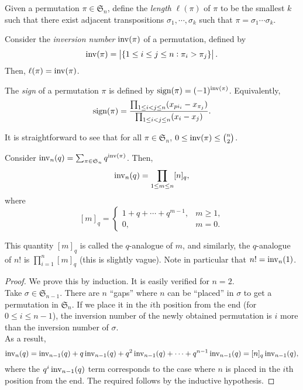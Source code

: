 	\begin{fdef}
		Given a permutation $\pi \in \mathfrak{S}_n$, define the \emph{length} $\ell(\pi)$ of $\pi$ to be the smallest $k$ such that there exist adjacent transpositions $\sigma_1,\cdots,\sigma_k$ such that $\pi = \sigma_1\cdots\sigma_k$.
	\end{fdef}

	\begin{fprop}
		Consider the \emph{inversion number} $\operatorname{inv}(\pi)$ of a permutation, defined by
		\[ \operatorname{inv}(\pi) = \left|\{ 1 \le i \le j \le n : \pi_i > \pi_j \}\right|. \]
		Then, $\ell(\pi) = \operatorname{inv}(\pi)$.
	\end{fprop}

	\begin{fdef}
		The \emph{sign} of a permutation $\pi$ is defined by $\operatorname{sign}(\pi) = (-1)^{\operatorname{inv}(\pi)}$. Equivalently,
		\[ \operatorname{sign}(\pi) = \frac{\prod_{1 \le i < j \le n} (x_{pi_i} - x_{\pi_j})}{\prod_{1 \le i < j \le n} (x_i - x_j)}. \]
	\end{fdef}



	It is straightforward to see that for all $\pi \in \mathfrak{S}_n$, $0 \le \operatorname{inv}(\pi) \le \binom{n}{2}$.
	\begin{fprop}
		\label{prop: inv n}
		Consider $\operatorname{inv}_n(q) = \sum_{\pi \in \mathfrak{S}_n} q^{\operatorname{inv}(\pi)}$. Then,
		\[ \operatorname{inv}_n(q) = \prod_{1 \le m \le n} [n]_q, \]
		where
		\[ [m]_q = \begin{cases} 1 + q + \cdots + q^{m-1}, & m \ge 1, \\ 0, & m = 0. \end{cases} \]
	\end{fprop}
	This quantity $[m]_q$ is called the $q$-analogue of $m$, and similarly, the $q$-analogue of $n!$ is $\prod_{i=1}^n [m]_q$ (this is slightly vague).
	Note in particular that $n! = \operatorname{inv}_n(1)$.
	\begin{proof}
		We prove this by induction. It is easily verified for $n = 2$.\\
		Take $\sigma \in \mathfrak{S}_{n-1}$. There are $n$ ``gaps'' where $n$ can be ``placed'' in $\sigma$ to get a permutation in $\mathfrak{S}_n$. If we place it in the $i$th position from the end (for $0 \le i \le n-1$), the inversion number of the newly obtained permutation is $i$ more than the inversion number of $\sigma$.\\
		As a result,
		\[ \operatorname{inv}_n(q) = \operatorname{inv}_{n-1}(q) + q \operatorname{inv}_{n-1}(q) + q^2 \operatorname{inv}_{n-1}(q) + \cdots + q^{n-1} \operatorname{inv}_{n-1}(q) = [n]_q \operatorname{inv}_{n-1}(q), \]
		where the $q^i \operatorname{inv}_{n-1}(q)$ term corresponds to the case where $n$ is placed in the $i$th position from the end. The required follows by the inductive hypothesis.
	\end{proof}

